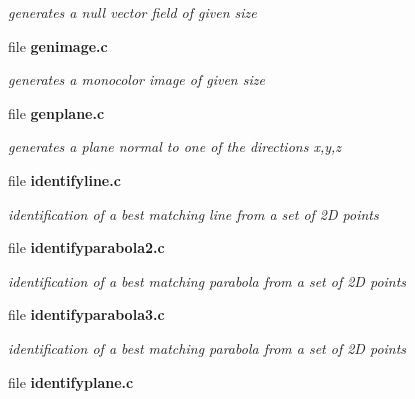 \begin{DoxyCompactItemize}
\begin{DoxyCompactList}\small\item\em generates a null vector field of given size \item\end{DoxyCompactList}

\item 
file {\bf genimage.c}


\begin{DoxyCompactList}\small\item\em generates a monocolor image of given size \item\end{DoxyCompactList}

\item 
file {\bf genplane.c}


\begin{DoxyCompactList}\small\item\em generates a plane normal to one of the directions x,y,z \item\end{DoxyCompactList}

\item 
file {\bf identifyline.c}


\begin{DoxyCompactList}\small\item\em identification of a best matching line from a set of 2D points \item\end{DoxyCompactList}

\item 
file {\bf identifyparabola2.c}


\begin{DoxyCompactList}\small\item\em identification of a best matching parabola from a set of 2D points \item\end{DoxyCompactList}

\item 
file {\bf identifyparabola3.c}


\begin{DoxyCompactList}\small\item\em identification of a best matching parabola from a set of 2D points \item\end{DoxyCompactList}

\item 
file {\bf identifyplane.c}



\end{DoxyCompactItemize}
